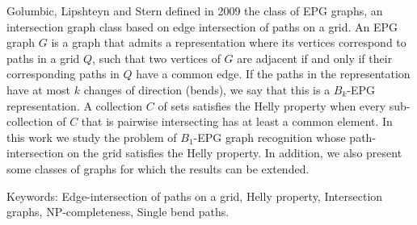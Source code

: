 \begin{foreignabstract}
Golumbic, Lipshteyn and Stern defined in 2009 the class of EPG graphs, an intersection graph class  based on edge intersection of paths on a grid. An EPG graph $G$ is a graph that admits a representation where its vertices correspond to paths in a grid $Q$, such that two vertices of $G$ are adjacent if and only if their corresponding paths in $Q$ have a common edge. If the paths in the representation have at most $k$ changes of direction  (bends), we say that this is a  $B_k$-EPG representation. A collection $C$ of sets satisfies the Helly property when every sub-collection of $C$ that is pairwise intersecting has at least a common element. In this work we study the problem of $B_1$-EPG graph recognition whose path-intersection on the grid satisfies the Helly property. In addition, we also present some classes of graphs for which the results can be extended.



Keywords: Edge-intersection of paths on a grid, Helly property, Intersection graphs, NP-completeness, Single bend paths.

\end{foreignabstract}

